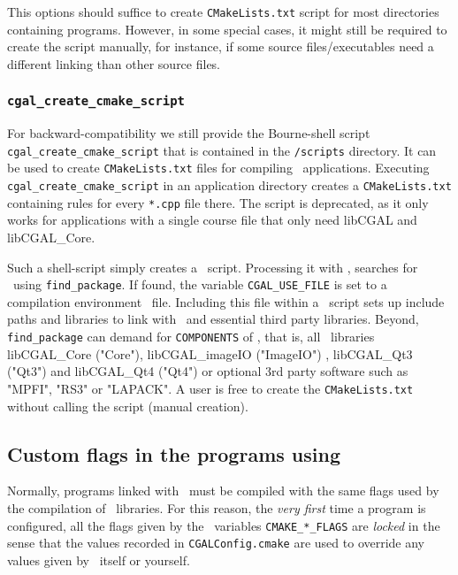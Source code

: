 This options should suffice to create \texttt{CMakeLists.txt} script
for most directories containing programs. However, in some special
cases, it might still be required to create the script manually, for
instance, if some source files/executables need a different linking than
other source files. 

\begin{ccDeprecated}
\subsubsection{\texttt{cgal\_create\_cmake\_script\label{sec:create_cgal_cmake_script}}}

For backward-compatibility we still provide the 
Bourne-shell script \texttt{cgal\_create\_cmake\_script} that 
is contained in the
\texttt{\cgalrel/scripts} directory. It can be used to create
\texttt{CMakeLists.txt} files for compiling \cgal\ applications. Executing
\texttt{cgal\_create\_cmake\_script} in an application directory creates a
\texttt{CMakeLists.txt} containing rules for every \texttt{*.cpp} file
there. The script is deprecated, as it only works for applications 
with a single course file that only need libCGAL and libCGAL\_Core.
\end{ccDeprecated}

Such a shell-script simply creates a \cmake\ script. Processing it
with \cmake, searches for \cgal\ using \texttt{find\_package}. If found,
the variable \texttt{CGAL\_USE\_FILE} is set to a compilation environment \cmake\ file. Including
this file within a \cmake\ script sets up include paths and libraries to
link with \cgal\ and essential third party libraries. Beyond,
\texttt{find\_package} can demand for \texttt{COMPONENTS} of \cgal,
that is, all \cgal\ libraries libCGAL\_Core ("Core"),
libCGAL\_imageIO ("ImageIO") , libCGAL\_Qt3 ("Qt3") and libCGAL\_Qt4
("Qt4") or optional 3rd party software such as "MPFI", "RS3" or
"LAPACK". A user is free to create the \texttt{CMakeLists.txt}
without calling the script (manual creation).


\subsection{Custom flags in the programs using \cgal}

Normally, programs linked with \cgal\ must be compiled with the same flags
used by the compilation of \cgal\
libraries. For this reason, the \emph{very first} time
a program is configured, all the flags given by the \cmake\ variables \texttt{CMAKE\_*\_FLAGS}
are \emph{locked} in the sense that the values recorded in \texttt{CGALConfig.cmake} 
are used to override any values given by \cmake\ itself or yourself.

